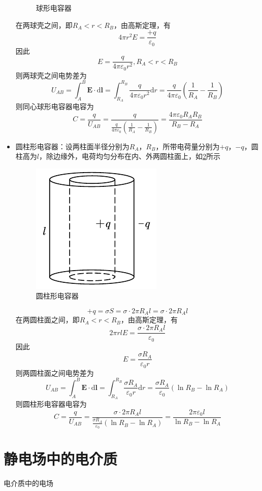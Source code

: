 \documentclass[12pt, a4paper, twoside]{ctexbook}
\begin{document}
\begin{itemize}
\begin{figure}[H]
        \caption{球形电容器}\label{fig:球形电容器}
    \end{figure}
    在两球壳之间，即$R_A<r<R_B$，由高斯定理，有
    $$
    4\pi r^2E=\frac{+q}{\varepsilon_0}
    $$
    因此
    $$
    E=\frac{q}{4\pi\varepsilon_0r^2},R_A<r<R_B
    $$
    则两球壳之间电势差为
    $$
    U_{AB}=\int_{A}^{B}\boldsymbol{E}\cdot\mathrm{d}\boldsymbol{l}=\int_{R_A}^{R_B}\frac{q}{4\pi\varepsilon_0r^2}\mathrm{d}r=\frac{q}{4\pi\varepsilon_0}\left(\frac{1}{R_A}-\frac{1}{R_B}\right)
    $$
    则同心球形电容器电容为
    $$
    C=\frac{q}{U_{AB}}=\frac{q}{\frac{q}{4\pi\varepsilon_0}\left(\frac{1}{R_A}-\frac{1}{R_B}\right)}=\frac{4\pi\varepsilon_0R_AR_B}{R_B-R_A}
    $$
    \item {\sonti 圆柱形电容器}：设两柱面半径分别为$R_A$，$R_B$，所带电荷量分别为$+q$，$-q$，圆柱高为$l$，除边缘外，电荷均匀分布在内、外两圆柱面上，如\textcolor{blue}{\cref{fig:圆柱形电容器}}所示
    \begin{figure}[H]
        \centerline{\includegraphics[scale=1.4]{圆柱形电容器.pdf}}
        \caption{圆柱形电容器}\label{fig:圆柱形电容器}
    \end{figure}
    $$
    +q=\sigma S=\sigma\cdot2\pi R_Al=\sigma\cdot2\pi R_Al
    $$
    在两圆柱面之间，即$R_A<r<R_B$，由高斯定理，有
    $$
    2\pi rlE=\frac{\sigma\cdot2\pi R_Al}{\varepsilon_0}
    $$
    因此
    $$
    E=\frac{\sigma R_A}{\varepsilon_0r}
    $$
    则两圆柱面之间电势差为
    $$
    U_{AB}=\int_{A}^{B}\boldsymbol{E}\cdot\mathrm{d}\boldsymbol{l}=\int_{R_A}^{R_B}\frac{\sigma R_A}{\varepsilon_0r}\mathrm{d}r=\frac{\sigma R_A}{\varepsilon_0}\left(\ln R_B-\ln R_A\right)
    $$
    则圆柱形电容器电容为
    $$
    C=\frac{q}{U_{AB}}=\frac{\sigma\cdot2\pi R_Al}{\frac{\sigma R_A}{\varepsilon_0}\left(\ln R_B-\ln R_A\right)}=\frac{2\pi\varepsilon_0l}{\ln R_B-\ln R_A}
    $$
\end{itemize}
\section{静电场中的电介质}
{\sonti 电介质中的电场}
\end{document}
